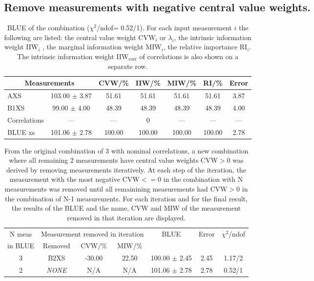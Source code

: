 \subsection{Remove measurements with negative central value weights.}
\begin{table}[H]
\scriptsize
\begin{center}
\renewcommand{\arraystretch}{1.1}
\begin{tabular}{|lc|c|c|c|c|c|}
\hline
\multicolumn{2}{|c|}{Measurements} & CVW/\%  & IIW/\%  & MIW/\%  & RI/\%  & {\tiny Error}\\
\hline
AXS &     103.00 $\pm$       3.87 &      51.61 &      51.61 &      51.61 &      51.61 &       3.87\\
B1XS &      99.00 $\pm$       4.00 &      48.39 &      48.39 &      48.39 &      48.39 &       4.00\\
Correlations & --- & --- &  0 & --- & --- & ---\\
\hline
BLUE {\tiny xs} &     101.06 $\pm$       2.78 &     100.00 &     100.00 &     100.00 &     100.00 &       2.78\\
\hline
\end{tabular}
\caption{BLUE of the combination ($\chi^2$/ndof=      0.52/1).
 For each input measurement $i$ the following are listed: the central value weight CVW$_i$ or $\lambda_i$, the intrinsic information weight IIW$_i$ , the marginal information weight MIW$_i$, the relative importance RI$_i$. The intrinsic information weight IIW$_{\mathrm{corr}}$ of correlations is also shown on a separate row.}
\renewcommand{\arraystretch}{1}
\end{center}
\end{table}
\begin{table}[H]
\scriptsize
\begin{center}
\renewcommand{\arraystretch}{1.2}
\begin{tabular}{|c|c|c|c|c|c|c|}
\hline
N {\tiny meas} & \multicolumn{3}{c|}{Measurement removed in iteration} & \multirow{2}{*}{BLUE} & \multirow{2}{*}{\tiny Error} & \multirow{2}{*}{\tiny$\chi^2$/ndof}\\
\cline{2-4}
{\tiny in BLUE} & Removed & CVW/\% & MIW/\% & & & \\\hline
3 & B2XS &     -30.00 &      22.50 &     100.00 $\pm$      2.45 &       2.45 &       1.17/2 \\
\hline
2 & {\em NONE} & N/A & N/A & 
    101.06 $\pm$      2.78 &       2.78 &       0.52/1 \\
\hline
\end{tabular}
\caption{From the original combination of 3 with nominal correlations, a new combination where all remaining 2 measurements have central value weights CVW$>$0 was derived by removing measurements iteratively. At each step of the iteration, the measurement with the most negative CVW$<=$0 in the combination with N measurements was removed until all remainining measurements had CVW$>$0 in the combination of N-1 measurements. For each iteration and for the final result, the results of the BLUE and the name, CVW and MIW of the measurement removed in that iteration are displayed.}
\renewcommand{\arraystretch}{1}
\end{center}
\end{table}
